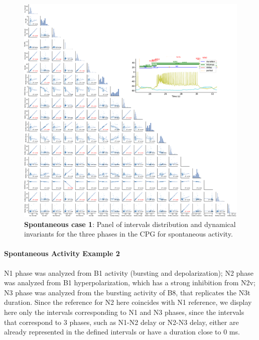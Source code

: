 \begin{figure}[htbp]
	\centering
	\includegraphics[width=\textwidth]{./invariants/data/SUSSEX/prep2/images/3phases/panel_with_pairplot.pdf}
	\caption{\textbf{Spontaneous case 1}: Panel of intervals distribution and dynamical invariants for the three phases in the CPG for spontaneous activity.}
	\label{fig:prep2 pairplot invariants}
\end{figure}


%

\paragraph{Spontaneous Activity Example 2}
N1 phase was analyzed from B1 activity (bursting and depolarization); N2 phase was analyzed from B1 hyperpolarization, which has a strong inhibition from N2v; N3 phase was analyzed from the bursting activity of B8, that replicates the N3t duration. 
Since the reference for N2 here coincides with N1 reference, we display here only the intervals corresponding to N1 and N3 phases, since the intervals that correspond to 3 phases, such as N1-N2 delay or N2-N3 delay, either are already represented in the defined intervals or have a duration close to 0 ms.

